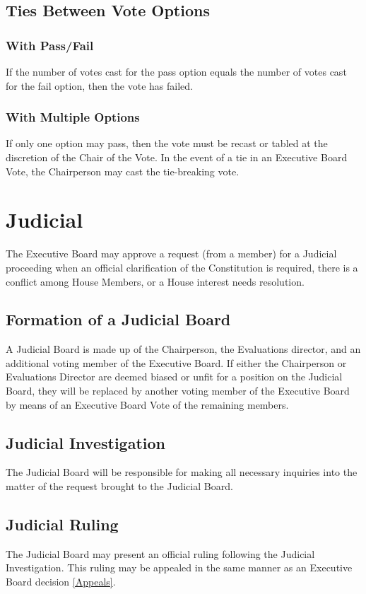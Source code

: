 \documentclass{article}
\newcommand{\article}[1]{\section{#1} \label{#1}}
\newcommand{\asection}[1]{\subsection{#1} \label{#1}}
\newcommand{\asubsection}[1]{\subsubsection{#1} \label{#1}}
\begin{document}
\asection{Ties Between Vote Options}
\asubsection{With Pass/Fail}
If the number of votes cast for the pass option equals the number of votes cast for the fail option, then the vote has failed.
\asubsection{With Multiple Options}
If only one option may pass, then the vote must be recast or tabled at the discretion of the Chair of the Vote.
In the event of a tie in an Executive Board Vote, the Chairperson may cast the tie-breaking vote.

\article{Judicial}
The Executive Board may approve a request (from a member) for a Judicial proceeding when an official clarification of the Constitution is required, there is a conflict among House Members, or a House interest needs resolution.
\asection{Formation of a Judicial Board}
A Judicial Board is made up of the Chairperson, the Evaluations director, and an additional voting member of the Executive Board.
If either the Chairperson or Evaluations Director are deemed biased or unfit for a position on the Judicial Board, they will be replaced by another voting member of the Executive Board by means of an Executive Board Vote of the remaining members.
\asection{Judicial Investigation}
The Judicial Board will be responsible for making all necessary inquiries into the matter of the request brought to the Judicial Board.
\asection{Judicial Ruling}
The Judicial Board may present an official ruling following the Judicial Investigation.
This ruling may be appealed in the same manner as an Executive Board decision \ref{Appeals}.
\end{document}
